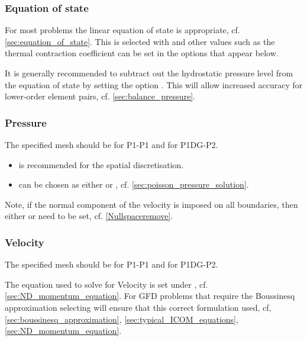 \subsubsection{Equation of state}

For most problems the linear equation of state is appropriate, cf. \ref{sec:equation_of_state}. This is selected with  and other values such as the thermal contraction coefficient can be set in the options that appear below. 

It is generally recommended to subtract out the hydrostatic pressure level from the equation of state by setting the option . This will allow increased accuracy for lower-order element pairs, cf. \ref{sec:balance_pressure}.

\subsubsection{Pressure}

The specified mesh should be  for P1-P1 and  for P1DG-P2. 

\begin{itemize}
\item {} is recommended for the spatial discretisation. 
\item {} can be chosen as either  or , cf. \ref{sec:poisson_pressure_solution}.
\end{itemize}

Note, if the normal component of the velocity is imposed on all boundaries, then either  or  need to be set, cf. \ref{Nullspaceremove}.

\subsubsection{Velocity}

The specified mesh should be  for P1-P1 and  for P1DG-P2. 

The equation used to solve for Velocity is set under , cf. \ref{sec:ND_momentum_equation}. For GFD problems that require the Boussinesq approximation selecting  will ensure that this correct formulation used, cf, \ref{sec:boussinesq_approximation}, \ref{sec:typical_ICOM_equations}, \ref{sec:ND_momentum_equation}.

